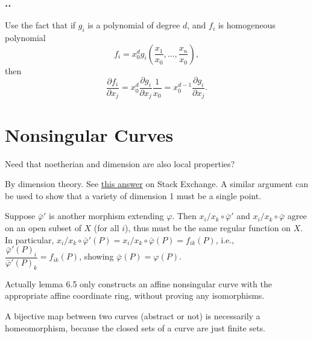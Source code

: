 \documentclass{note}
\newcounter{exercise}[section]
\newcommand{\Ex}{%
    \stepcounter{exercise}%
    \subsubsection*{\thesection.\arabic{exercise}.}%
}
\begin{document}
\setcounter{exercise}{7}

\Ex

Use the fact that if $g_i$ is a polynomial of degree $d$, and $f_i$ is
homogeneous polynomial
\begin{equation*}
  f_i = x_0^d g_i\left(\frac{x_1}{x_0}, \dots, \frac{x_n}{x_0}\right),
\end{equation*}
then
\begin{equation*}
  \frac{\partial f_i}{\partial x_j} = x_0^d\frac{\partial g_i}{\partial
    x_j}\frac{1}{x_0} = x_0^{d-1}\frac{\partial g_i}{\partial x_j}.
\end{equation*}

\section{Nonsingular Curves}

 Need that noetherian and dimension are also local
properties?


By dimension theory. See
\href{https://math.stackexchange.com/questions/140592/closed-proper-subvarieties-of-curves-are-finite-sets-of-points}
{this answer} on Stack Exchange. A similar argument can be used to show that a
variety of dimension 1 must be a single point.



Suppose $\bar\varphi'$ is another morphism extending $\varphi$. Then
$x_i/x_k\circ\bar\varphi'$ and $x_i/x_k\circ\bar\varphi$ agree on an open
subset of $X$ (for all $i$), thus must be the same regular function on $X$. In
particular, $x_i/x_k\circ\bar\varphi'(P) = x_i/x_k\circ\bar\varphi(P) =
  f_{ik}(P)$, i.e., $\dfrac{\bar\varphi'(P)_i}{\bar\varphi'(P)_k} = f_{ik}(P)$,
showing $\bar\varphi(P) = \varphi(P)$.

 Actually lemma 6.5 only constructs an affine nonsingular curve
with the appropriate affine coordinate ring, without proving any isomorphisms.



A bijective map between two curves (abstract or not) is necessarily a
homeomorphism, because the closed sets of a curve are just finite sets.
\end{document}
